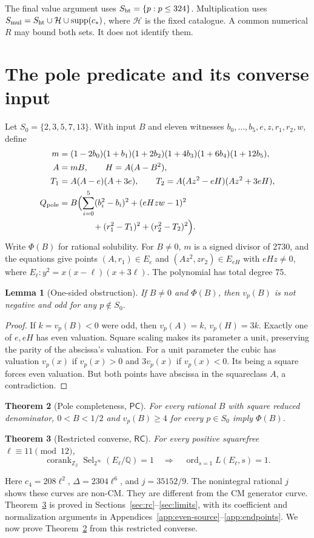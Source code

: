 \documentclass[11pt]{article}
\newtheorem{theorem}{Theorem}[section]
\newtheorem{lemma}[theorem]{Lemma}
\theoremstyle{definition}
\theoremstyle{remark}
\newcommand{\Q}{\mathbb Q}
\newcommand{\Z}{\mathbb Z}
\newcommand{\Sel}{\operatorname{Sel}}
\newcommand{\ord}{\operatorname{ord}}
\begin{document}
The final value argument uses $S_{\rm ht}=\{p:p\le324\}$. Multiplication
uses $S_{\rm mul}=S_{\rm ht}\cup\mathcal H\cup\operatorname{supp}(c_*)$,
where $\mathcal H$ is the fixed catalogue. A common numerical $R$ may
bound both sets. It does not identify them.

\section{The pole predicate and its converse input}\label{sec:pole}
Let $S_0=\{2,3,5,7,13\}$. With input $B$ and eleven witnesses
$b_0,\ldots,b_5,e,z,r_1,r_2,w$, define
\begin{align*}
 m&=(1-2b_0)(1+b_1)(1+2b_2)(1+4b_3)(1+6b_4)(1+12b_5),\\
 A&=mB,\qquad H=A(A-B^2),\\
 T_1&=A(A-e)(A+3e),\qquad T_2=A(Az^2-eH)(Az^2+3eH),\\
 Q_{\rm pole}&=B\Bigl(\sum_{i=0}^5(b_i^2-b_i)^2+(eHzw-1)^2\\
 &\hspace{4em}+(r_1^2-T_1)^2+(r_2^2-T_2)^2\Bigr).
\end{align*}
Write $\Phi(B)$ for rational solubility. For $B\ne0$, $m$ is a signed
divisor of 2730, and the equations give points $(A,r_1)\in E_e$ and
$(Az^2,zr_2)\in E_{eH}$ with $eHz\ne0$, where
$E_\ell:y^2=x(x-\ell)(x+3\ell)$. The polynomial has total degree 75.

\begin{lemma}[One-sided obstruction]\label{lem:pole}
If $B\ne0$ and $\Phi(B)$, then $v_p(B)$ is not negative and odd for
any $p\notin S_0$.
\end{lemma}
\begin{proof}
If $k=v_p(B)<0$ were odd, then $v_p(A)=k$, $v_p(H)=3k$.
Exactly one of $e,eH$ has even valuation. Square scaling makes its
parameter a unit, preserving the parity of the abscissa's valuation.
For a unit parameter the cubic has valuation $v_p(x)$ if $v_p(x)>0$
and $3v_p(x)$ if $v_p(x)<0$. Its being a square forces even valuation.
But both points have abscissa in the squareclass $A$, a contradiction.
\end{proof}

\begin{theorem}[Pole completeness, $\mathsf{PC}$]\label{hyp:PC}
For every rational $B$ with square reduced denominator,
$0<B<1/2$ and $v_p(B)\ge4$ for every $p\in S_0$ imply $\Phi(B)$.
\end{theorem}
\begin{theorem}[Restricted converse, $\mathsf{RC}$]\label{hyp:RC}
For every positive squarefree $\ell\equiv11\pmod{12}$,
\[
 \operatorname{corank}_{\Z_2}\Sel_{2^\infty}(E_\ell/\Q)=1
 \quad\Longrightarrow\quad\ord_{s=1}L(E_\ell,s)=1.
\]
\end{theorem}
Here $c_4=208\ell^2$, $\Delta=2304\ell^6$, and $j=35152/9$.
The nonintegral rational $j$ shows these curves are non-CM. They are
different from the CM generator curve. Theorem~\ref{hyp:RC} is proved in
Sections~\ref{sec:rc}--\ref{sec:limits}, with its coefficient and
normalization arguments in Appendices~\ref{app:even-source}--\ref{app:endpoints}.
We now prove Theorem~\ref{hyp:PC} from this restricted converse.
\end{document}
